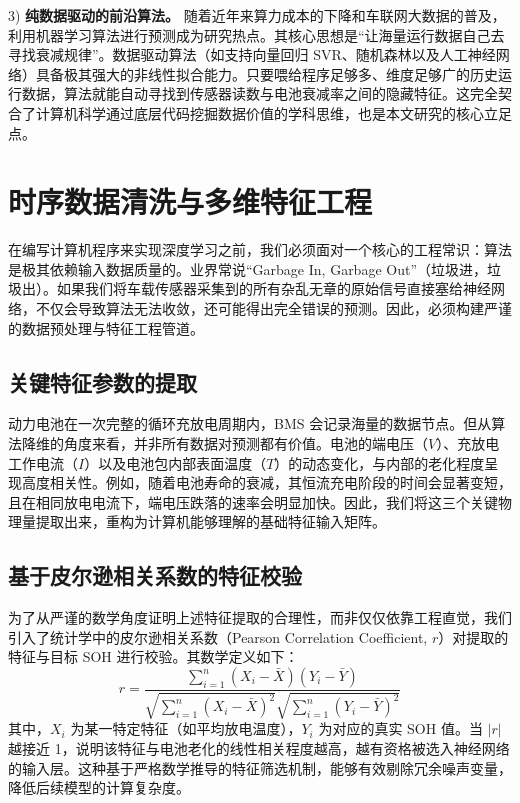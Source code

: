 \documentclass[10pt, a4paper, twocolumn]{ctexart}
\begin{document}
3) \textbf{纯数据驱动的前沿算法。} 随着近年来算力成本的下降和车联网大数据的普及，利用机器学习算法进行预测成为研究热点。其核心思想是“让海量运行数据自己去寻找衰减规律”。数据驱动算法（如支持向量回归 SVR、随机森林以及人工神经网络）具备极其强大的非线性拟合能力。只要喂给程序足够多、维度足够广的历史运行数据，算法就能自动寻找到传感器读数与电池衰减率之间的隐藏特征。这完全契合了计算机科学通过底层代码挖掘数据价值的学科思维，也是本文研究的核心立足点。

\section{时序数据清洗与多维特征工程}
在编写计算机程序来实现深度学习之前，我们必须面对一个核心的工程常识：算法是极其依赖输入数据质量的。业界常说“Garbage In, Garbage Out”（垃圾进，垃圾出）。如果我们将车载传感器采集到的所有杂乱无章的原始信号直接塞给神经网络，不仅会导致算法无法收敛，还可能得出完全错误的预测。因此，必须构建严谨的数据预处理与特征工程管道。

\subsection{关键特征参数的提取}
动力电池在一次完整的循环充放电周期内，BMS 会记录海量的数据节点。但从算法降维的角度来看，并非所有数据对预测都有价值。电池的端电压（$V$）、充放电工作电流（$I$）以及电池包内部表面温度（$T$）的动态变化，与内部的老化程度呈现高度相关性。例如，随着电池寿命的衰减，其恒流充电阶段的时间会显著变短，且在相同放电电流下，端电压跌落的速率会明显加快。因此，我们将这三个关键物理量提取出来，重构为计算机能够理解的基础特征输入矩阵。

\subsection{基于皮尔逊相关系数的特征校验}
为了从严谨的数学角度证明上述特征提取的合理性，而非仅仅依靠工程直觉，我们引入了统计学中的皮尔逊相关系数（Pearson Correlation Coefficient, $r$）对提取的特征与目标 SOH 进行校验。其数学定义如下：
\begin{equation}
    r = \frac{\sum_{i=1}^{n} (X_i - \bar{X})(Y_i - \bar{Y})}{\sqrt{\sum_{i=1}^{n} (X_i - \bar{X})^2} \sqrt{\sum_{i=1}^{n} (Y_i - \bar{Y})^2}} 
\end{equation}
其中，$X_i$ 为某一特定特征（如平均放电温度），$Y_i$ 为对应的真实 SOH 值。当 $|r|$ 越接近 1，说明该特征与电池老化的线性相关程度越高，越有资格被选入神经网络的输入层。这种基于严格数学推导的特征筛选机制，能够有效剔除冗余噪声变量，降低后续模型的计算复杂度。
\end{document}
